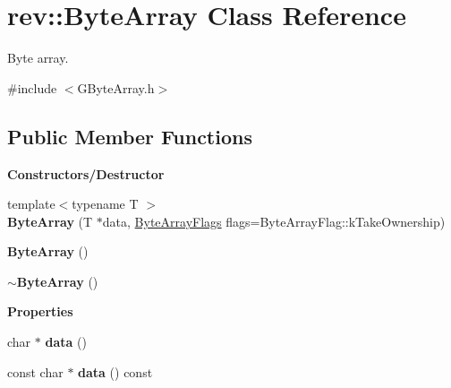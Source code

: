 \hypertarget{classrev_1_1_byte_array}{}\section{rev\+::Byte\+Array Class Reference}
\label{classrev_1_1_byte_array}


Byte array.  




{\ttfamily \#include $<$G\+Byte\+Array.\+h$>$}

\subsection*{Public Member Functions}
\begin{Indent}\textbf{ Constructors/\+Destructor}\par
\begin{DoxyCompactItemize}
\item 
\mbox{\label{classrev_1_1_byte_array_a2fe7cca7e8149da94d3b1243eb2ad7f0}} 
{\footnotesize template$<$typename T $>$ }\\{\bfseries Byte\+Array} (T $\ast$data, \mbox{\hyperlink{classrev_1_1_flags}{Byte\+Array\+Flags}} flags=Byte\+Array\+Flag\+::k\+Take\+Ownership)
\item 
\mbox{\label{classrev_1_1_byte_array_afe32d2c0192cd4559ef89034c91ef2b6}} 
{\bfseries Byte\+Array} ()
\item 
\mbox{\label{classrev_1_1_byte_array_af124de675432dbd345fc45f04ac14c97}} 
{\bfseries $\sim$\+Byte\+Array} ()
\end{DoxyCompactItemize}
\end{Indent}
\begin{Indent}\textbf{ Properties}\par
\begin{DoxyCompactItemize}
\item 
\mbox{\label{classrev_1_1_byte_array_aa6cc070245756b88c1cb6efae4cc0ab4}} 
char $\ast$ {\bfseries data} ()
\item 
\mbox{\label{classrev_1_1_byte_array_a54dfb03db1cf6169c6786e364e0851d2}} 
const char $\ast$ {\bfseries data} () const
\end{DoxyCompactItemize}
\end{Indent}
